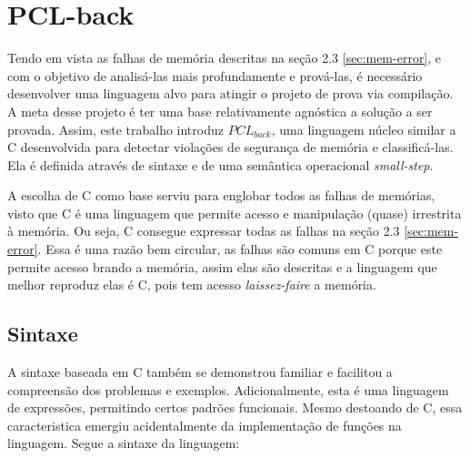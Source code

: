 \chapter{PCL-back}


Tendo em vista as falhas de memória descritas na seção 2.3 \ref{sec:mem-error}, e com o objetivo de analisá-las mais profundamente e prová-las, é necessário desenvolver uma linguagem alvo para atingir o projeto de prova via compilação. A meta desse projeto é ter uma base relativamente agnóstica a solução a ser provada. Assim, este trabalho introduz $PCL_{back}$, uma linguagem núcleo similar a C desenvolvida para detectar violações de segurança de memória e classificá-las. Ela é definida através de sintaxe e de uma semântica operacional \emph{small-step}. 

A escolha de C como base serviu para englobar todos as falhas de memórias, visto que C é uma linguagem que permite acesso e manipulação (quase) irrestrita à memória. Ou seja, C consegue expressar todas as falhas na seção 2.3 \ref{sec:mem-error}. Essa é uma razão bem circular, as falhas são comuns em C porque este permite acesso brando a memória, assim elas são descritas e a linguagem que melhor reproduz elas é C, pois tem acesso \emph{laissez-faire} a memória.

\section{Sintaxe}

A sintaxe baseada em C também se demonstrou familiar e facilitou a compreensão dos problemas e exemplos. Adicionalmente, esta é uma linguagem de expressões, permitindo certos padrões funcionais. Mesmo destoando de C, essa caracteristica emergiu acidentalmente da implementação de funções na linguagem. Segue a sintaxe da linguagem:

